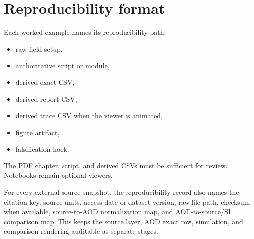 \section{Reproducibility format}
\label{app:manual-reproducibility-format}

Each worked example names its reproducibility path:
\begin{itemize}[leftmargin=*]
  \item raw field setup,
  \item authoritative script or module,
  \item derived exact CSV,
  \item derived report CSV,
  \item derived trace CSV when the viewer is animated,
  \item figure artifact,
  \item falsification hook.
\end{itemize}

The PDF chapter, script, and derived CSVs must be sufficient for review. Notebooks remain optional viewers.

For every external source snapshot, the reproducibility record also names the citation key, source units, access date or dataset version, raw-file path, checksum when available, source-to-AOD normalization map, and AOD-to-source/SI comparison map. This keeps the source layer, AOD exact row, simulation, and comparison rendering auditable as separate stages.

